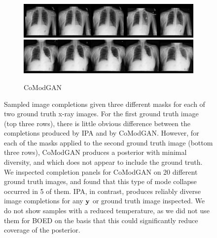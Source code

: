\begin{figure}[t]
\begin{subfigure}[t]{0.4\textwidth}
    \includegraphics[height=\xrayimgheight]{figs/cigcvae/image-samples/xray/comodgan_5.jpg}
    \includegraphics[height=\xrayimgheight]{figs/cigcvae/image-samples/xray/comodgan_6.jpg}
    \caption{CoModGAN}
  \end{subfigure}
  \caption{Sampled image completions given three different masks for each of two
    ground truth x-ray images. For the first ground truth image (top three
    rows), there is little obvious difference between the completions produced
    by IPA and by CoModGAN. However, for each of the masks applied to the second
    ground truth image (bottom three rows), CoModGAN produces a posterior with
    minimal diversity, and which does not appear to include the ground truth. We
    inspected completion panels for CoModGAN on 20 different ground truth
    images, and found that this type of mode collapse occurred in 5 of them.
    IPA, in contrast, produces reliably diverse image completions for any
    ${\mathbf{y}}$ or ground truth image inspected. We do not show samples with a
    reduced temperature, as we did not use them for BOED on the basis that this
    could significantly reduce coverage of the posterior. }
    \label{fig:cigcvae-xray-samples}
  \end{figure}

